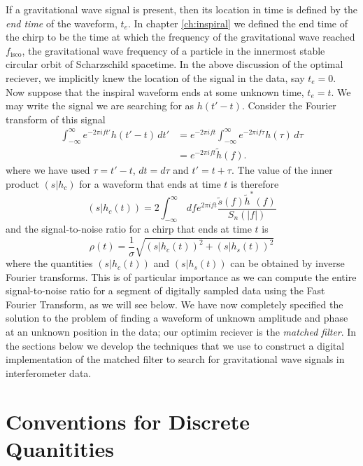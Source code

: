 If a gravitational wave signal is present, then its location in time is
defined by the \emph{end time} of the waveform, $t_e$. In chapter
\ref{ch:inspiral} we defined the end time of the chirp to be the time at which
the frequency of the gravitational wave reached $f_\mathrm{isco}$, the
gravitational wave frequency of a particle in the innermost stable circular
orbit of Scharzschild spacetime.  In the above discussion of the optimal
reciever, we implicitly knew the location of the signal in the data, say 
$t_e = 0$. Now suppose that the inspiral waveform ends at some unknown time,
$t_e = t$. We may write the signal we are searching for as $h(t'-t)$. Consider
the Fourier transform of this signal
\begin{equation}
\begin{split}
\int_{-\infty}^\infty e^{-2\pi i f t'} h(t'-t) \, dt' &= 
e^{-2\pi ift} \int_{-\infty}^\infty e^{-2\pi i f \tau} h(\tau) \, d\tau \\
&= e^{-2\pi ift} \tilde{h}(f).
\end{split}
\end{equation}
where we have used $\tau = t' - t$, $dt = d\tau$ and $t' = t + \tau$.
The value of the inner product $(s|h_c)$ for a waveform that ends at time $t$ is
therefore
\begin{equation}
(s|h_c(t)) = 2 \int_{-\infty}^\infty\,df e^{2\pi ift}
\frac{\tilde{s}(f)\tilde{h}^\ast(f)}{S_n(|f|)}
\label{eq:ipift}
\end{equation}
and the signal-to-noise ratio for a chirp that ends at time $t$ is
\begin{equation}
\rho(t) = \frac{1}{\sigma} \sqrt{ (s|h_c(t))^2 + (s|h_s(t))^2}
\end{equation}
where the quantities $(s|h_c(t))$ and $(s|h_s(t))$ can be obtained by inverse
Fourier transforms. This is of particular importance as we can compute the
entire signal-to-noise ratio for a segment of digitally sampled data using the
Fast Fourier Transform, as we will see below. We have now completely specified
the solution to the problem of finding a waveform of unknown amplitude and
phase at an unknown position in the data; our optimim reciever is the
\emph{matched filter}. In the sections below we develop the techniques that we
use to construct a digital implementation of the matched filter to search for
gravitational wave signals in interferometer data.

\section{Conventions for Discrete Quanitities}
\label{s:conventions}

